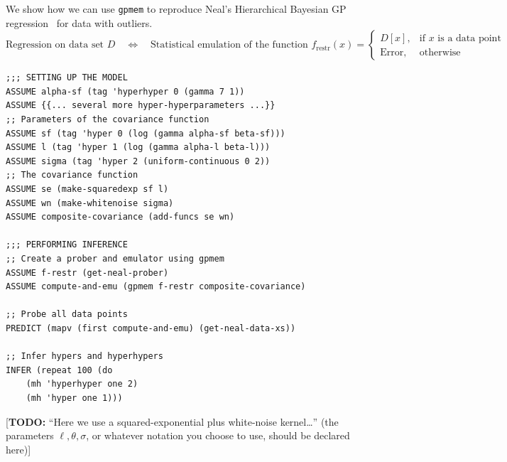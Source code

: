 \documentclass[a0,portrait]{a0poster}
\newcommand{\restr}{{\textrm{restr}}}
\begin{document}
\begin{multicols}{2}
We show how we can use  {\tt gpmem} to reproduce Neal's Hierarchical Bayesian GP regression~\cite{neal1997monte} for data with outliers.
\[
  \text{Regression on data set $D$}
  \quad\Longleftrightarrow\quad
  \text{Statistical emulation of the function }
    f_\restr(x) = \begin{cases}
      D[x], & \text{if $x$ is a data point} \\
      \text{Error}, & \text{otherwise}
    \end{cases}
\]
\begin{minipage}{\linewidth}
\belowcaptionskip=-10pt
\begin{lstlisting}[frame=single,caption=Hierarchical  GP Smoothing,mathescape,label=alg:gphierarch]
;;; SETTING UP THE MODEL
ASSUME alpha-sf (tag 'hyperhyper 0 (gamma 7 1))
ASSUME {{... several more hyper-hyperparameters ...}}
;; Parameters of the covariance function
ASSUME sf (tag 'hyper 0 (log (gamma alpha-sf beta-sf)))
ASSUME l (tag 'hyper 1 (log (gamma alpha-l beta-l)))
ASSUME sigma (tag 'hyper 2 (uniform-continuous 0 2))
;; The covariance function
ASSUME se (make-squaredexp sf l)
ASSUME wn (make-whitenoise sigma)
ASSUME composite-covariance (add-funcs se wn)

;;; PERFORMING INFERENCE
;; Create a prober and emulator using gpmem
ASSUME f-restr (get-neal-prober)
ASSUME compute-and-emu (gpmem f-restr composite-covariance)

;; Probe all data points
PREDICT (mapv (first compute-and-emu) (get-neal-data-xs))

;; Infer hypers and hyperhypers
INFER (repeat 100 (do
    (mh 'hyperhyper one 2)
    (mh 'hyper one 1)))

\end{lstlisting}
\end{minipage}

[\textbf{TODO:} ``Here we use a squared-exponential plus white-noise kernel\ldots'' (the parameters $\ell,\theta,\sigma$, or whatever notation you choose to use, should be declared here)]


\end{multicols}
\end{document}
